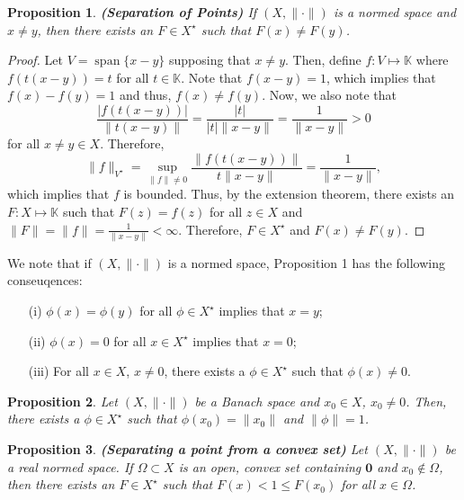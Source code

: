 \documentclass[oneside]{book}
\newtheorem{proposition}{Proposition}
\def\K{\mathbb{K}}
\newcommand{\Om}{\Omega}
\newcommand{\sbs}{\subset}
\newcommand{\Xs}{X^{\star}}
\newcommand{\Vs}{V^{\star}}
\DeclareMathOperator*{\spa}{span}
\newcommand{\ns}{(X, \| \cdot \|)}
\begin{document}
\begin{proposition}\textbf{(Separation of Points)} If $(X, \| \cdot \|)$ is a normed space and $x \neq y$, then there exists an $F \in \Xs$ such that $F(x) \neq F(y)$.
\end{proposition}
\begin{proof}
Let $V = \spa\{ x - y\}$ supposing that $x \neq y$. Then, define $f: V \mapsto \K$ where $f(t(x-y)) = t$ for all $t \in \K$. Note that $f(x-y) = 1$, which implies that $f(x) - f(y) = 1$ and thus, $f(x) \neq f(y)$. Now, we also note that 
\[\frac{|f(t(x-y))|}{\| t(x-y)\|} = \frac{|t|}{|t| \| x - y \|} = \frac{1}{\| x - y\|} > 0 \]
for all $x \neq y \in X$. Therefore, 
\[ \| f \|_{\Vs} = \sup\limits_{\| f \| \neq 0} \frac{\| f(t(x-y))\|}{t \| x - y\|} = \frac{1}{\| x- y\|},\]
which implies that $f$ is bounded. Thus, by the extension theorem, there exists an $F: X \mapsto \K$ such that $F(z) = f(z)$ for all $z \in X$ and $\| F\| = \| f \| = \frac{1}{\| x - y\|} < \infty$. Therefore, $F \in \Xs$ and $F(x) \neq F(y)$. 
\end{proof}
We note that if $(X, \| \cdot \|)$ is a normed space, Proposition 1 has the following conseuqences:
\begin{enumerate}
\item[(i)] $\phi(x) = \phi(y)$ for all $\phi \in \Xs$ implies that $x = y$;
\item[(ii)] $\phi(x) = 0$ for all $x \in \Xs$ implies that $x = 0$;
\item[(iii)] For all $x \in X$, $x \neq 0$, there exists a $\phi \in \Xs$ such that $\phi(x) \neq 0$.
\end{enumerate}
\begin{proposition}
Let $\ns$ be a Banach space and $x_0 \in X$, $x_0 \neq 0$. Then, there exists a $\phi \in \Xs$ such that $\phi(x_0) = \| x_0 \|$ and $\| \phi \| = 1$. 
\end{proposition}
\begin{proposition} \textbf{(Separating a point from a convex set)} Let $\ns$ be a real normed space. If $\Om \sbs X$ is an open, convex set containing $\mathbf{0}$ and $x_0 \not\in \Om$, then there exists an $F \in \Xs$ such that $F(x) < 1 \leq F(x_0)$ for all $x \in \Om$.
\end{proposition}
\end{document}
